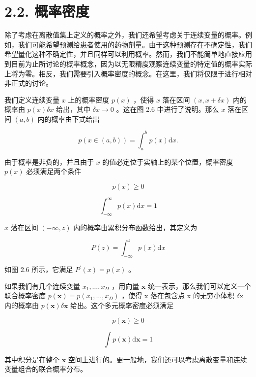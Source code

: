 \documentclass[10pt]{article}
\begin{document}
\section*{2.2. 概率密度}

除了考虑在离散值集上定义的概率之外，我们还希望考虑关于连续变量的概率。例如，我们可能希望预测给患者使用的药物剂量。由于这种预测存在不确定性，我们希望量化这种不确定性，并且同样可以利用概率。然而，我们不能简单地直接应用到目前为止所讨论的概率概念，因为以无限精度观察连续变量的特定值的概率实际上将为零。相反，我们需要引入概率密度的概念。在这里，我们将仅限于进行相对非正式的讨论。

我们定义连续变量 \(x\) 上的概率密度 \(p\left( x\right)\) ，使得 \(x\) 落在区间 \(\left( {x,x + {\delta x}}\right)\) 内的概率由 \(p\left( x\right) {\delta x}\) 给出，其中 \({\delta x} \rightarrow  0\) 。这在图 2.6 中进行了说明。那么 \(x\) 落在区间 \(\left( {a,b}\right)\) 内的概率由下式给出

\[
p\left( {x \in  \left( {a,b}\right) }\right)  = {\int }_{a}^{b}p\left( x\right) \mathrm{d}x. \tag{2.23}
\]

由于概率是非负的，并且由于 \(x\) 的值必定位于实轴上的某个位置，概率密度 \(p\left( x\right)\) 必须满足两个条件

\[
p\left( x\right)  \geq  0 \tag{2.24}
\]

\[
{\int }_{-\infty }^{\infty }p\left( x\right) \mathrm{d}x = 1 \tag{2.25}
\]

\(x\) 落在区间 \(\left( {-\infty ,z}\right)\) 内的概率由累积分布函数给出，其定义为

\[
P\left( z\right)  = {\int }_{-\infty }^{z}p\left( x\right) \mathrm{d}x \tag{2.26}
\]

如图 2.6 所示，它满足 \({P}^{\prime }\left( x\right)  = p\left( x\right)\) 。

如果我们有几个连续变量 \({x}_{1},\ldots ,{x}_{D}\) ，用向量 \(\mathbf{x}\) 统一表示，那么我们可以定义一个联合概率密度 \(p\left( \mathbf{x}\right)  = p\left( {{x}_{1},\ldots ,{x}_{D}}\right)\) ，使得 \(\mathrm{x}\) 落在包含点 \(\mathrm{x}\) 的无穷小体积 \(\delta \mathrm{x}\) 内的概率由 \(p\left( \mathbf{x}\right) \delta \mathbf{x}\) 给出。这个多元概率密度必须满足

\[
p\left( \mathbf{x}\right)  \geq  0 \tag{2.27}
\]

\[
\int p\left( \mathbf{x}\right) \mathrm{d}\mathbf{x} = 1 \tag{2.28}
\]

其中积分是在整个 \(\mathbf{x}\) 空间上进行的。更一般地，我们还可以考虑离散变量和连续变量组合的联合概率分布。
\end{document}
